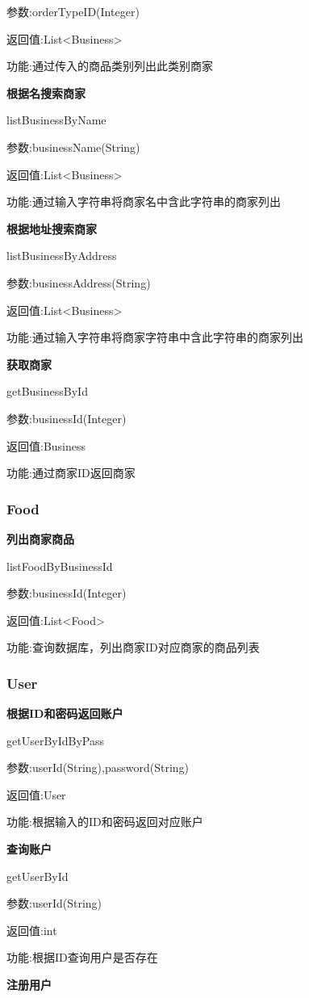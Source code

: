 参数:orderTypeID(Integer)

返回值:List<Business>

功能:通过传入的商品类别列出此类别商家

\textbf{根据名搜索商家}

listBusinessByName

参数:businessName(String)

返回值:List<Business>

功能:通过输入字符串将商家名中含此字符串的商家列出

\textbf{根据地址搜索商家}

listBusinessByAddress

参数:businessAddress(String)

返回值:List<Business>

功能:通过输入字符串将商家字符串中含此字符串的商家列出

\textbf{获取商家}

getBusinessById

参数:businessId(Integer)

返回值:Business

功能:通过商家ID返回商家

\subsubsection{Food}
\textbf{列出商家商品}

listFoodByBusinessId

参数:businessId(Integer)

返回值:List<Food>

功能:查询数据库，列出商家ID对应商家的商品列表

\subsubsection{User}
\textbf{根据ID和密码返回账户}

getUserByIdByPass

参数:userId(String),password(String)

返回值:User

功能:根据输入的ID和密码返回对应账户

\textbf{查询账户}

getUserById

参数:userId(String)

返回值:int

功能:根据ID查询用户是否存在

\textbf{注册用户}

